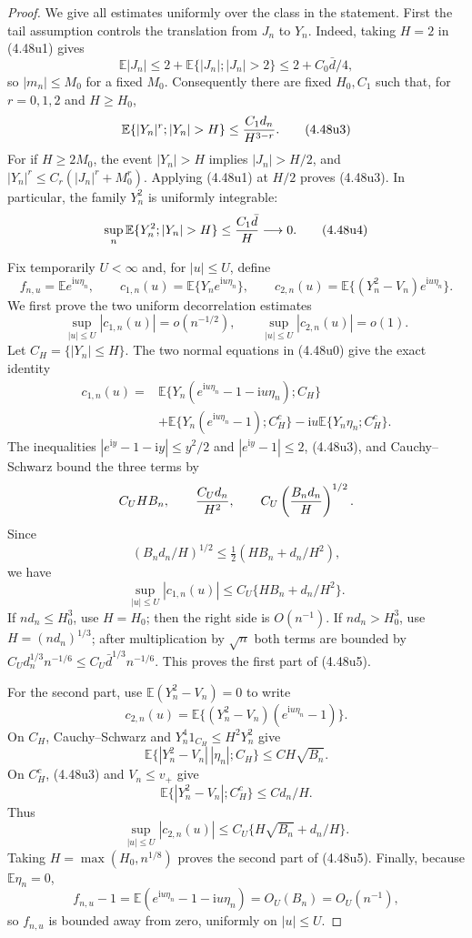 \documentclass[11pt,a4paper]{article}
\numberwithin{equation}{section}
\theoremstyle{definition}
\theoremstyle{remark}
\newcommand{\E}{\mathbb E}
\newcommand{\ii}{\mathrm i}
\begin{document}
\begin{proof}
We give all estimates uniformly over the class in the statement.  First
the tail assumption controls the translation from $J_n$ to $Y_n$.  Indeed,
taking $H=2$ in (4.48u1) gives
\[
 \E|J_n|\le2+\E\{|J_n|;|J_n|>2\}\le2+C_0\bar d/4,
\]
so $|m_n|\le M_0$ for a fixed $M_0$.  Consequently there are fixed
$H_0,C_1$ such that, for $r=0,1,2$ and $H\ge H_0$,
\[
 \E\{|Y_n|^r;|Y_n|>H\}
 \le {C_1d_n\over H^{3-r}}.                          \tag{4.48u3}
\]
For if $H\ge2M_0$, the event $|Y_n|>H$ implies $|J_n|>H/2$, and
$|Y_n|^r\le C_r(|J_n|^r+M_0^r)$.  Applying (4.48u1) at $H/2$ proves
(4.48u3).  In particular, the family $Y_n^2$ is uniformly integrable:
\[
 \sup_n\E\{Y_n^2;|Y_n|>H\}\le {C_1\bar d\over H}
 \longrightarrow0.                                  \tag{4.48u4}
\]

Fix temporarily $U<\infty$ and, for $|u|\le U$, define
\[
 f_{n,u}=\E e^{\ii u\eta_n},\qquad
 c_{1,n}(u)=\E\{Y_ne^{\ii u\eta_n}\},\qquad
 c_{2,n}(u)=\E\{(Y_n^2-V_n)e^{\ii u\eta_n}\}.
\]
We first prove the two uniform decorrelation estimates
\[
 \sup_{|u|\le U}|c_{1,n}(u)|=o(n^{-1/2}),
 \qquad
 \sup_{|u|\le U}|c_{2,n}(u)|=o(1).                   \tag{4.48u5}
\]
Let $C_H=\{|Y_n|\le H\}$.  The two normal equations in (4.48u0) give the
exact identity
\begin{align*}
 c_{1,n}(u)={}&\E\{Y_n(e^{\ii u\eta_n}-1-\ii u\eta_n);C_H\}\\
 &+\E\{Y_n(e^{\ii u\eta_n}-1);C_H^c\}
       -\ii u\E\{Y_n\eta_n;C_H^c\}.
                                                               \tag{4.48u6}
\end{align*}
The inequalities $|e^{\ii y}-1-\ii y|\le y^2/2$ and
$|e^{\ii y}-1|\le2$, (4.48u3), and Cauchy--Schwarz bound the three terms by
\[
 C_UHB_n,\qquad {C_Ud_n\over H^2},\qquad
 C_U\left({B_nd_n\over H}\right)^{1/2}.
\]
Since
\[
 (B_nd_n/H)^{1/2}
 \le\tfrac12(HB_n+d_n/H^2),
\]
we have
\[
 \sup_{|u|\le U}|c_{1,n}(u)|
 \le C_U\{HB_n+d_n/H^2\}.                            \tag{4.48u7}
\]
If $nd_n\le H_0^3$, use $H=H_0$; then the right side is $O(n^{-1})$.
If $nd_n>H_0^3$, use $H=(nd_n)^{1/3}$; after multiplication by $\sqrt n$
both terms are bounded by
$C_Ud_n^{1/3}n^{-1/6}\le C_U\bar d^{1/3}n^{-1/6}$.  This proves the first
part of (4.48u5).

For the second part, use $\E(Y_n^2-V_n)=0$ to write
\[
 c_{2,n}(u)=\E\{(Y_n^2-V_n)(e^{\ii u\eta_n}-1)\}.
\]
On $C_H$, Cauchy--Schwarz and
$Y_n^4 1_{C_H}\le H^2Y_n^2$ give
\[
 \E\{|Y_n^2-V_n|\,|\eta_n|;C_H\}\le CH\sqrt{B_n}.
\]
On $C_H^c$, (4.48u3) and $V_n\le v_+$ give
\[
 \E\{|Y_n^2-V_n|;C_H^c\}\le C d_n/H.
\]
Thus
\[
 \sup_{|u|\le U}|c_{2,n}(u)|
 \le C_U\{H\sqrt{B_n}+d_n/H\}.                      \tag{4.48u8}
\]
Taking $H=\max(H_0,n^{1/8})$ proves the second part of (4.48u5).  Finally,
because $\E\eta_n=0$,
\[
 f_{n,u}-1=\E(e^{\ii u\eta_n}-1-\ii u\eta_n)=O_U(B_n)=O_U(n^{-1}),
                                                               \tag{4.48u9}
\]
so $f_{n,u}$ is bounded away from zero, uniformly on $|u|\le U$.


\end{proof}
\end{document}
